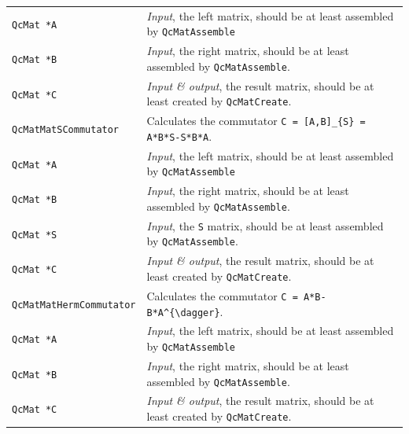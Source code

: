 \documentclass[a4paper,11pt,twoside,openright]{book}
\begin{document}
\begin{center}
\begin{longtable}{l|p{}}
    \hspace*{2ex}\verb|QcMat *A| %
      & \textsl{Input}, the left matrix, should be at least assembled
        by \verb|QcMatAssemble|\\
    \hspace*{2ex}\verb|QcMat *B| %
      & \textsl{Input}, the right matrix, should be at least assembled
        by \verb|QcMatAssemble|.\\
    \hspace*{2ex}\verb|QcMat *C| %
      & \textsl{Input \& output}, the result matrix, should be at least created
        by \verb|QcMatCreate|.\\
    \hline
%
    \verb|QcMatMatSCommutator|\index{\texttt{QcMatMatSCommutator}} %
      & Calculates the commutator \verb|C = [A,B]_{S} = A*B*S-S*B*A|.\\
    \hspace*{2ex}\verb|QcMat *A| %
      & \textsl{Input}, the left matrix, should be at least assembled
        by \verb|QcMatAssemble|\\
    \hspace*{2ex}\verb|QcMat *B| %
      & \textsl{Input}, the right matrix, should be at least assembled
        by \verb|QcMatAssemble|.\\
    \hspace*{2ex}\verb|QcMat *S| %
      & \textsl{Input}, the \verb|S| matrix, should be at least assembled
        by \verb|QcMatAssemble|.\\
    \hspace*{2ex}\verb|QcMat *C| %
      & \textsl{Input \& output}, the result matrix, should be at least created
        by \verb|QcMatCreate|.\\
    \hline
%
    \verb|QcMatMatHermCommutator|\index{\texttt{QcMatMatHermCommutator}} %
      & Calculates the commutator \verb|C = A*B-B*A^{\dagger}|.\\
    \hspace*{2ex}\verb|QcMat *A| %
      & \textsl{Input}, the left matrix, should be at least assembled
        by \verb|QcMatAssemble|\\
    \hspace*{2ex}\verb|QcMat *B| %
      & \textsl{Input}, the right matrix, should be at least assembled
        by \verb|QcMatAssemble|.\\
    \hspace*{2ex}\verb|QcMat *C| %
      & \textsl{Input \& output}, the result matrix, should be at least created
        by \verb|QcMatCreate|.\\

\end{longtable}
\end{center}
\end{document}
